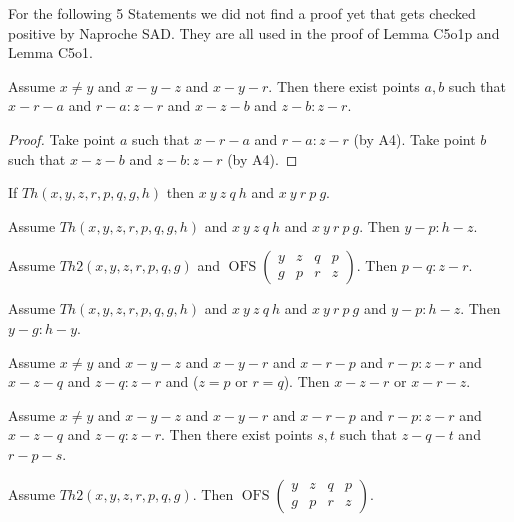 \documentclass{article}
\newcommand{\OFS}[8]{\operatorname{OFS}
\left(\begin{smallmatrix}%
#1 & #2 & #3 & #4 \\
#5 & #6 & #7 & #8
\end{smallmatrix}\right)%
}
\begin{document}
  For the following 5 Statements we did not find a proof yet that gets checked positive by Naproche SAD. They are all used in the proof of Lemma C5o1p and Lemma C5o1.

  \begin{forthel}
    \begin{lemma}[C5o1f]
      Assume $x \neq y$ and $x-y-z$ and $x-y-r$. Then there exist points $a,b$ such that $x-r-a$ and $r-a : z-r$ and $x-z-b$ and $z-b : z-r$.
    \end{lemma}
    \begin{proof}
    	Take point $a$ such that $x-r-a$ and $r-a : z-r$ (by A4).	Take point $b$ such that $x-z-b$ and $z-b : z-r$ (by A4).
    \end{proof}

    \begin{axiom}[C5o1g]
      If $Th(x,y,z,r,p,q,g,h)$ then $x~y~z~q~h$ and $x~y~r~p~g$.
    \end{axiom}

    \begin{axiom}[C5o1h]
      Assume $Th(x,y,z,r,p,q,g,h)$ and $x~y~z~q~h$ and $x~y~r~p~g$. Then $y-p : h-z$.
    \end{axiom}

    \begin{axiom}[C5o1i]
      Assume $Th2(x,y,z,r,p,q,g)$ and $\OFS{y}{z}{q}{p}{g}{p}{r}{z}$. Then $p-q : z-r$.
    \end{axiom}

    \begin{axiom}[C5o1j]
      Assume $Th(x,y,z,r,p,q,g,h)$ and $x~y~z~q~h$ and $x~y~r~p~g$ and $y-p : h-z$. Then $y-g : h-y$.
    \end{axiom}



    \begin{lemma}[C5o1k]
      Assume $x \neq y$ and $x-y-z$ and $x-y-r$ and $x-r-p$ and $r-p : z-r$ and $x-z-q$ and $z-q : z-r$ and ($z = p$ or $r = q$). Then $x-z-r$ or $x-r-z$.
    \end{lemma}

    \begin{lemma}[C5o1l]
      Assume $x \neq y$ and $x-y-z$ and $x-y-r$ and $x-r-p$ and $r-p : z-r$ and $x-z-q$ and $z-q : z-r$. Then there exist points $s,t$ such that $z-q-t$ and $r-p-s$.
    \end{lemma}

    \begin{lemma}[C5o1m]
      Assume $Th2(x,y,z,r,p,q,g)$. Then $\OFS{y}{z}{q}{p}{g}{p}{r}{z}$.
    \end{lemma}


\end{forthel}
\end{document}

